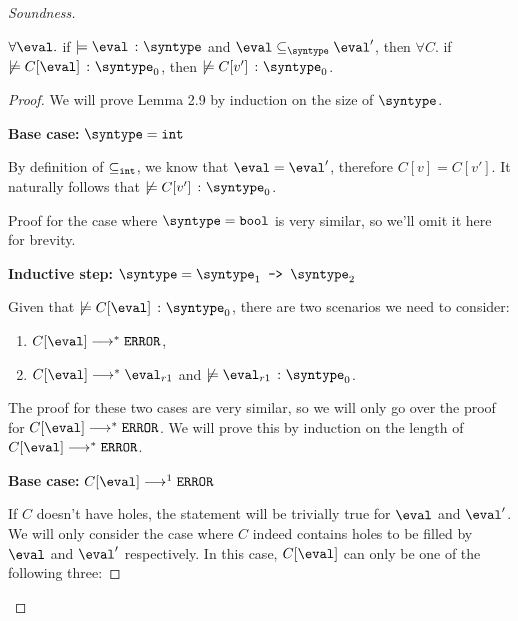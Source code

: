 \begin{proof}[Soundness]
  \begin{lemma}
    $\forall \eval.$ if $\models \hastype{\eval}{\syntype}$ and $\eval \subseteq_{\syntype} \eval'$, then $\forall C.$ if $\not \models \hastype{C[\eval]}{\syntype_0}$, then $\not \models \hastype{C[v']}{\syntype_0}$. 
  \end{lemma}

  \begin{proof}
    We will prove Lemma 2.9 by induction on the size of $\syntype$.

    \textbf{Base case: }$\syntype = \tint$

    By definition of $\subseteq_{\texttt{int}}$, we know that $\eval = \eval'$, therefore $C[v] = C[v']$. It naturally follows that $\not \models \hastype{C[v']}{\syntype_0}$.

    Proof for the case where $\syntype = \tbool$ is very similar, so we'll omit it here for brevity.

    \textbf{Inductive step: }$\syntype = \mkfun{\syntype_1}{\syntype_2}$

    Given that $\not \models \hastype{C[\eval]}{\syntype_0}$, there are two scenarios we need to consider:
    \begin{enumerate}
      \item $C[\eval] \smallsteps[] \eerror$,
      \item $C[\eval] \smallsteps[] \eval_{r1}$ and $\not \models \hastype{\eval_{r1}}{\syntype_0}$.
    \end{enumerate}

    The proof for these two cases are very similar, so we will only go over the proof for $C[\eval] \smallsteps[] \eerror$. We will prove this by induction on the length of $C[\eval] \smallsteps[] \eerror$.

    \textbf{Base case: }$C[\eval] \smallstep[] \eerror$
    
    If $C$ doesn't have holes, the statement will be trivially true for $\eval$ and $\eval'$. We will only consider the case where $C$ indeed contains holes to be filled by $\eval$ and $\eval'$ respectively.
    In this case, $C[\eval]$ can only be one of the following three:


\end{proof}
\end{proof}
